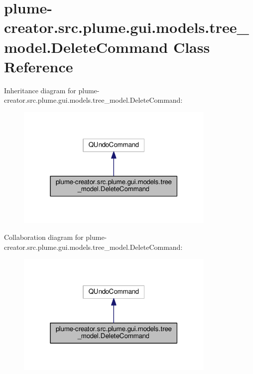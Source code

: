 \hypertarget{classplume-creator_1_1src_1_1plume_1_1gui_1_1models_1_1tree__model_1_1_delete_command}{}\section{plume-\/creator.src.\+plume.\+gui.\+models.\+tree\+\_\+model.\+Delete\+Command Class Reference}
\label{classplume-creator_1_1src_1_1plume_1_1gui_1_1models_1_1tree__model_1_1_delete_command}


Inheritance diagram for plume-\/creator.src.\+plume.\+gui.\+models.\+tree\+\_\+model.\+Delete\+Command\+:\nopagebreak
\begin{figure}[H]
\begin{center}
\leavevmode
\includegraphics[width=271pt]{classplume-creator_1_1src_1_1plume_1_1gui_1_1models_1_1tree__model_1_1_delete_command__inherit__graph}
\end{center}
\end{figure}


Collaboration diagram for plume-\/creator.src.\+plume.\+gui.\+models.\+tree\+\_\+model.\+Delete\+Command\+:\nopagebreak
\begin{figure}[H]
\begin{center}
\leavevmode
\includegraphics[width=271pt]{classplume-creator_1_1src_1_1plume_1_1gui_1_1models_1_1tree__model_1_1_delete_command__coll__graph}
\end{center}
\end{figure}

